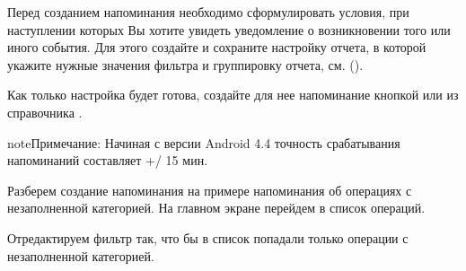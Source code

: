 \documentclass[a4paper,10pt,russian]{sphinxmanual}
\begin{document}
\sphinxAtStartPar
Перед созданием напоминания необходимо сформулировать условия, при наступлении которых Вы хотите увидеть
уведомление о возникновении того или иного события. Для этого создайте и сохраните настройку
отчета, в которой укажите нужные значения фильтра и группировку отчета, см.
{\hyperref[\detokenize{shortcuts:chapter-shortcuts}]{}} ().

\sphinxAtStartPar
Как только настройка будет готова, создайте для нее напоминание кнопкой  или из справочника .

\begin{sphinxadmonition}{note}{Примечание:}
\sphinxAtStartPar
Начиная с версии Android 4.4 точность срабатывания напоминаний составляет +/\sphinxhyphen{} 15 мин.
\end{sphinxadmonition}

\sphinxAtStartPar
Разберем создание напоминания на примере напоминания об операциях с незаполненной категорией. На главном экране
перейдем в список операций.

\noindent{}

\noindent{}

\noindent{}

\sphinxAtStartPar
Отредактируем фильтр так, что бы в список попадали только операции с незаполненной категорией.

\noindent{}

\noindent{}

\noindent{}

\noindent{}

\noindent{}

\noindent{}
\end{document}

